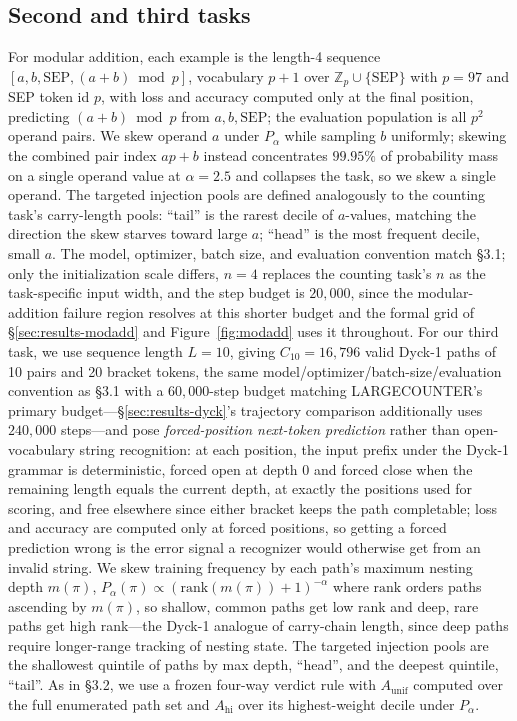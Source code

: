 \documentclass[11pt]{article}
\begin{document}
\subsection{Second and third tasks}
For modular addition, each example is the length-4 sequence $[a,b,\mathrm{SEP},(a+b)\bmod p]$, vocabulary $p+1$ over $\mathbb{Z}_p\cup\{\mathrm{SEP}\}$ with $p=97$ and SEP token id $p$, with loss and accuracy computed only at the final position, predicting $(a+b)\bmod p$ from $a,b,\mathrm{SEP}$; the evaluation population is all $p^2$ operand pairs. We skew operand $a$ under $P_\alpha$ while sampling $b$ uniformly; skewing the combined pair index $a p+b$ instead concentrates $99.95\%$ of probability mass on a single operand value at $\alpha=2.5$ and collapses the task, so we skew a single operand. The targeted injection pools are defined analogously to the counting task's carry-length pools: ``tail'' is the rarest decile of $a$-values, matching the direction the skew starves toward large $a$; ``head'' is the most frequent decile, small $a$. The model, optimizer, batch size, and evaluation convention match \S3.1; only the initialization scale differs, $n=4$ replaces the counting task's $n$ as the task-specific input width, and the step budget is $20{,}000$, since the modular-addition failure region resolves at this shorter budget and the formal grid of \S\ref{sec:results-modadd} and Figure~\ref{fig:modadd} uses it throughout. For our third task, we use sequence length $L=10$, giving $C_{10}=16{,}796$ valid Dyck-1 paths of 10 pairs and 20 bracket tokens, the same model/optimizer/batch-size/evaluation convention as \S3.1 with a $60{,}000$-step budget matching LARGECOUNTER's primary budget---\S\ref{sec:results-dyck}'s trajectory comparison additionally uses $240{,}000$ steps---and pose \emph{forced-position next-token prediction} rather than open-vocabulary string recognition: at each position, the input prefix under the Dyck-1 grammar is deterministic, forced open at depth $0$ and forced close when the remaining length equals the current depth, at exactly the positions used for scoring, and free elsewhere since either bracket keeps the path completable; loss and accuracy are computed only at forced positions, so getting a forced prediction wrong is the error signal a recognizer would otherwise get from an invalid string. We skew training frequency by each path's maximum nesting depth $m(\pi)$, $P_\alpha(\pi)\propto(\mathrm{rank}(m(\pi))+1)^{-\alpha}$ where $\mathrm{rank}$ orders paths ascending by $m(\pi)$, so shallow, common paths get low rank and deep, rare paths get high rank---the Dyck-1 analogue of carry-chain length, since deep paths require longer-range tracking of nesting state. The targeted injection pools are the shallowest quintile of paths by max depth, ``head'', and the deepest quintile, ``tail''. As in \S3.2, we use a frozen four-way verdict rule with $A_{\mathrm{unif}}$ computed over the full enumerated path set and $A_{\mathrm{hi}}$ over its highest-weight decile under $P_\alpha$.
\end{document}
